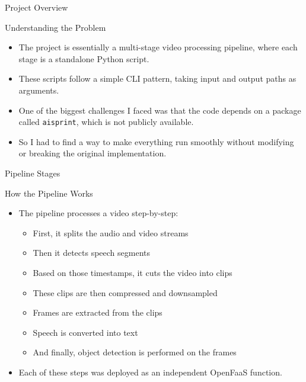 \documentclass[aspectratio=169,10pt]{beamer}
\begin{document}
\begin{frame}{Project Overview}
    \begin{block}{Understanding the Problem}
        \begin{itemize}[<+->]
            \item The project is essentially a multi-stage video processing pipeline, where each stage is a standalone Python script.
            \item These scripts follow a simple CLI pattern, taking input and output paths as arguments.
            \item One of the biggest challenges I faced was that the code depends on a package called \texttt{aisprint}, which is not publicly available.
            \item So I had to find a way to make everything run smoothly without modifying or breaking the original implementation.
        \end{itemize}
    \end{block}
\end{frame}
\begin{frame}{Pipeline Stages}
    \begin{block}{How the Pipeline Works}
        \begin{itemize}[<+->]
            \item The pipeline processes a video step-by-step:
            \begin{itemize}[<+->]
                \item First, it splits the audio and video streams
                \item Then it detects speech segments
                \item Based on those timestamps, it cuts the video into clips
                \item These clips are then compressed and downsampled
                \item Frames are extracted from the clips
                \item Speech is converted into text
                \item And finally, object detection is performed on the frames
            \end{itemize}
            \item Each of these steps was deployed as an independent OpenFaaS function.
        \end{itemize}
    \end{block}
\end{frame}
\end{document}

